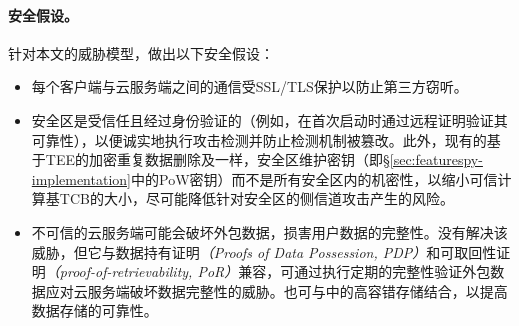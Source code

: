 \paragraph*{安全假设。}针对本文的威胁模型，做出以下安全假设：
\begin{itemize}
    \item 每个客户端与云服务端之间的通信受SSL/TLS保护以防止第三方窃听。
    \item 安全区是受信任且经过身份验证的（例如，在首次启动时通过远程证明验证其可靠性），以便诚实地执行攻击检测并防止检测机制被篡改。此外，现有的基于TEE的加密重复数据删除\cite{shinde20}及\sysnameS 一样，安全区维护密钥（即\S\ref{sec:featurespy-implementation}中的PoW密钥）而不是所有安全区内的机密性，以缩小可信计算基TCB的大小，尽可能降低针对安全区的侧信道攻击产生的风险\cite{fei21}。
    \item 不可信的云服务端可能会破坏外包数据，损害用户数据的完整性。\sysnameF 没有解决该威胁，但它与数据持有证明\textit{（Proofs of Data Possession, PDP）}\cite{ateniese2007provable}和可取回性证明\textit{（proof-of-retrievability, PoR）}\cite{juels2007pors}兼容，可通过执行定期的完整性验证外包数据应对云服务端破坏数据完整性的威胁。\sysnameF 也可与\cite{li15}中的高容错存储结合，以提高数据存储的可靠性。
\end{itemize}